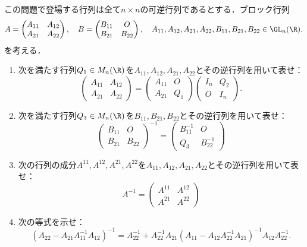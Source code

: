 \documentclass[uplatex,dvipdfmx]{jsarticle}
\begin{document}
\begin{tcolorbox}[colframe=ForestGreen, colback=ForestGreen!10!white,breakable,colbacktitle=ForestGreen!40!white,coltitle=black,fonttitle=\bfseries\sffamily,
    title=第３問]
    この問題で登場する行列は全て$n\times n$の可逆行列であるとする．ブロック行列
    \[A=\begin{pmatrix}
        A_{11}&A_{12}\\A_{21}&A_{22}
    \end{pmatrix},\quad B=\begin{pmatrix}B_{11}&O\\B_{21}&B_{22}\end{pmatrix},\quad A_{11},A_{12},A_{21},A_{22},B_{11},B_{21},B_{22}\in\GL_n(\R).\]
    を考える．
    \begin{enumerate}
        \item 次を満たす行列$Q_1\in M_n(\R)$を$A_{11},A_{12},A_{21},A_{22}$とその逆行列を用いて表せ：
        \[\begin{pmatrix}
            A_{11}&A_{12}\\A_{21}&A_{22}
        \end{pmatrix}=\begin{pmatrix}A_{11}&O\\A_{21}&Q_1\end{pmatrix}\begin{pmatrix}I_n&Q_2\\O&I_n\end{pmatrix}.\]
        \item 次を満たす行列$Q_3\in M_n(\R)$を$B_{11},B_{21},B_{22}$とその逆行列を用いて表せ：
        \[\begin{pmatrix}
            B_{11}&O\\B_{21}&B_{22}
        \end{pmatrix}^{-1}=\begin{pmatrix}
            B_{11}^{-1}&O\\Q_3&B_{22}^{-1}
        \end{pmatrix}\]
        \item 次の行列の成分$A^{11},A^{12},A^{21},A^{22}$を$A_{11},A_{12},A_{21},A_{22}$とその逆行列を用いて表せ：
        \[A^{-1}=\begin{pmatrix}
            A^{11}&A^{12}\\A^{21}&A^{22}
        \end{pmatrix}\]
        \item 次の等式を示せ：
        \[(A_{22}-A_{21}A_{11}^{-1}A_{12})^{-1}=A_{22}^{-1}+A_{22}^{-1}A_{21}(A_{11}-A_{12}A_{22}^{-1}A_{21})^{-1}A_{12}A_{22}^{-1}.\]
    \end{enumerate}
\end{tcolorbox}
\end{document}
